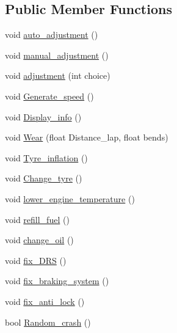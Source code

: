 \subsection*{Public Member Functions}
\begin{DoxyCompactItemize}
\item 
void \hyperlink{class_cars_ae7e733fb41d03d016dd0c7d5a047f9c9}{auto\+\_\+adjustment} ()
\item 
void \hyperlink{class_cars_a87ccc17a207f38be7181636757e52e6c}{manual\+\_\+adjustment} ()
\item 
void \hyperlink{class_cars_ae2d5dd594083b2fd32f47f12da04a8d7}{adjustment} (int choice)
\item 
void \hyperlink{class_cars_aaa3b901d766d7ff61cbc2e051ca55128}{Generate\+\_\+speed} ()
\item 
void \hyperlink{class_cars_a970d82288b7511be3afed4ed8f72160c}{Display\+\_\+info} ()
\item 
void \hyperlink{class_cars_a8d455ff9ab265c027f03c271b7038a0f}{Wear} (float Distance\+\_\+lap, float bends)
\item 
void \hyperlink{class_cars_afe32bdace895fbed2d6a802cab3baa73}{Tyre\+\_\+inflation} ()
\item 
void \hyperlink{class_cars_a0a127960d5e34f1647f9fe0142bcdce1}{Change\+\_\+tyre} ()
\item 
void \hyperlink{class_cars_a141616b56eb08bdb6d4d5b7d123ff86e}{lower\+\_\+engine\+\_\+temperature} ()
\item 
void \hyperlink{class_cars_a571b988bef6b1fed4e38c0d57a9c641a}{refill\+\_\+fuel} ()
\item 
void \hyperlink{class_cars_a04b60bab05e297effbb029d8fe2d70b0}{change\+\_\+oil} ()
\item 
void \hyperlink{class_cars_a63e3cb5337f7d5f30344cd4a5c3459cf}{fix\+\_\+\+D\+RS} ()
\item 
void \hyperlink{class_cars_ad28e5a3597b09c98f65111079b0d1032}{fix\+\_\+braking\+\_\+system} ()
\item 
void \hyperlink{class_cars_a5854a8bdc81e465b20a20c0f7a5f1e58}{fix\+\_\+anti\+\_\+lock} ()
\item 
bool \hyperlink{class_cars_a3296547b82a71df909ec54f5dae28116}{Random\+\_\+crash} ()
\end{DoxyCompactItemize}
